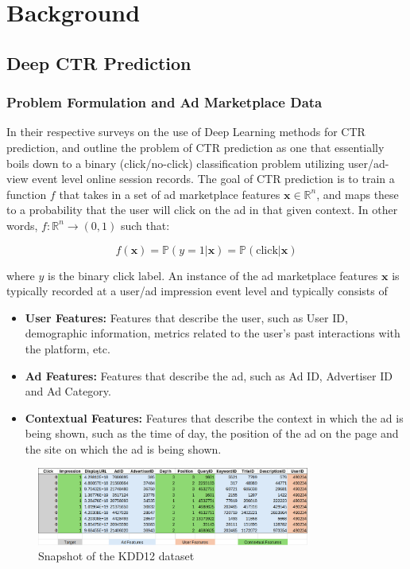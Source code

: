 \documentclass{mldsmsc}
\begin{document}
\chapter{Background}
\label{chap:background}

\section{Deep CTR Prediction}

\subsection{Problem Formulation and Ad Marketplace Data}

In their respective surveys on the use of Deep Learning methods for CTR prediction, \cite{RefWorks:gu2021ad} 
and \cite{RefWorks:zhang2021deep} outline the problem of CTR prediction as one that essentially boils down to
a binary (click/no-click) classification problem utilizing user/ad-view event level online session records. 
The goal of CTR prediction is to train a function $f$ that takes in a set of ad marketplace 
features $\mathbf{x} \in \mathbb{R}^n$, and maps these to a probability that the user 
will click on the ad in that given context. In other words, $f: \mathbb{R}^n \rightarrow (0,1)$ such that:

$$
f(\mathbf{x}) = \mathbb{P}(y = 1 | \mathbf{x}) = \mathbb{P}(\text{click}| \mathbf{x})
$$

where $y$ is the binary click label. An instance of the ad marketplace features $\mathbf{x}$ is typically
recorded at a user/ad impression event level and typically consists of

\begin{itemize}
\item \textbf{User Features:} Features that describe the user, such as User ID, demographic information,
metrics related to the user's past interactions with the platform, etc.
\item \textbf{Ad Features:} Features that describe the ad, such as Ad ID, Advertiser ID and Ad Category.
\item \textbf{Contextual Features:} Features that describe the context in which the ad is being shown, such as
the time of day, the position of the ad on the page and the site on which the ad is being shown.
\end{itemize}

\begin{figure}[h]
\centering
\includegraphics[width=0.8\textwidth]{../figures/kdd12_snapshot.png}
\caption{Snapshot of the KDD12 dataset \cite{RefWorks:aden2012kdd}}
\label{fig:kdd12-snapshot}
\end{figure}
\end{document}
